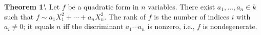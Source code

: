 \textbf{Theorem 1'.} Let $f$ be a quadratic form in $n$ variables. There exist $a_1, \ldots, a_n \in k$ such that $f \sim a_1 X_1^2 + \cdots + a_n X_n^2$. The rank of $f$ is the number of indices $i$ with $a_i \neq 0$; it equals $n$ iff the discriminant $a_1 \cdots a_n$ is nonzero, i.e., $f$ is nondegenerate.
